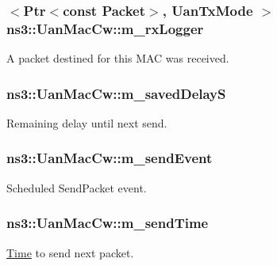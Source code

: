 \subsubsection[{\texorpdfstring{m\+\_\+rx\+Logger}{m_rxLogger}}]{$<${\bf Ptr}$<$const {\bf Packet}$>$, {\bf Uan\+Tx\+Mode} $>$ ns3\+::\+Uan\+Mac\+Cw\+::m\+\_\+rx\+Logger\hspace{0.3cm}{\ttfamily [private]}}\hypertarget{classns3_1_1UanMacCw_a31e115318fa3de0a4172a4b40144e464}{}\label{classns3_1_1UanMacCw_a31e115318fa3de0a4172a4b40144e464}
A packet destined for this M\+AC was received. 
\subsubsection[{\texorpdfstring{m\+\_\+saved\+DelayS}{m_savedDelayS}}]{ ns3\+::\+Uan\+Mac\+Cw\+::m\+\_\+saved\+DelayS\hspace{0.3cm}{\ttfamily [private]}}\hypertarget{classns3_1_1UanMacCw_ad33eeb167802beb8d58a53149973d801}{}\label{classns3_1_1UanMacCw_ad33eeb167802beb8d58a53149973d801}
Remaining delay until next send. 
\subsubsection[{\texorpdfstring{m\+\_\+send\+Event}{m_sendEvent}}]{ ns3\+::\+Uan\+Mac\+Cw\+::m\+\_\+send\+Event\hspace{0.3cm}{\ttfamily [private]}}\hypertarget{classns3_1_1UanMacCw_aaec3d67f48da09675c7160b6f0b8f310}{}\label{classns3_1_1UanMacCw_aaec3d67f48da09675c7160b6f0b8f310}
Scheduled Send\+Packet event. 
\subsubsection[{\texorpdfstring{m\+\_\+send\+Time}{m_sendTime}}]{ ns3\+::\+Uan\+Mac\+Cw\+::m\+\_\+send\+Time\hspace{0.3cm}{\ttfamily [private]}}\hypertarget{classns3_1_1UanMacCw_a055cbef7661203850c3842684015b76a}{}\label{classns3_1_1UanMacCw_a055cbef7661203850c3842684015b76a}
\hyperlink{classns3_1_1Time}{Time} to send next packet. 
